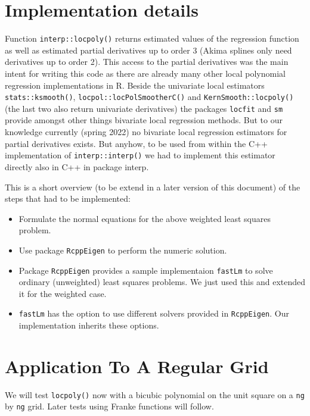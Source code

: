 \documentclass[nojss]{jss}
\def\cmd{\lstinline[basicstyle=\ttfamily,keywordstyle={},breaklines=true,breakatwhitespace=false]}
\begin{document}

\section{Implementation details}
\label{sec:impl}
Function \cmd{interp::locpoly()} returns estimated values of the
regression function as well as estimated partial derivatives up to
order 3 (Akima splines only need derivatives up to order 2). 
This access to the partial derivatives was the main intent
for writing this code as there are already many other local polynomial
regression implementations in R. Beside the univariate local
estimators \cmd{stats::ksmooth()}, \cmd{locpol::locPolSmootherC()} and
\cmd{KernSmooth::locpoly()} (the last two also return univariate
derivatives) the packages \cmd{locfit} and \cmd{sm} provide amongst
other things bivariate local regression methods. But to our knowledge
currently (spring 2022) no bivariate local regression estimators for
partial derivatives exists. 
But anyhow, to be
used from within the C++ implementation of \cmd{interp::interp()} we
had to implement this estimator directly also in C++ in package {interp}.


This is a short overview (to be extend in a later version of this document) 
of the steps that had to be implemented:
\begin{itemize}
\item Formulate the normal equations for the above weighted least squares 
problem. 
\item Use package \cmd{RcppEigen} to perform the numeric solution. 
\item Package \cmd{RcppEigen} provides a sample implementaion \cmd{fastLm} to 
solve ordinary (unweighted) least squares problems. We just used this and 
extended it for the weighted case.  
\item \cmd{fastLm} has the option to use different solvers provided 
in \cmd{RcppEigen}. Our implementation inherits these options.
\end{itemize}


\section[Regular Grid]{Application To A Regular Grid}
\label{sec:regular}

We will test \texttt{locpoly()} now with a bicubic polynomial on the
unit square on a \texttt{ng} by \texttt{ng} grid. Later tests using
Franke functions will follow.
\end{document}
